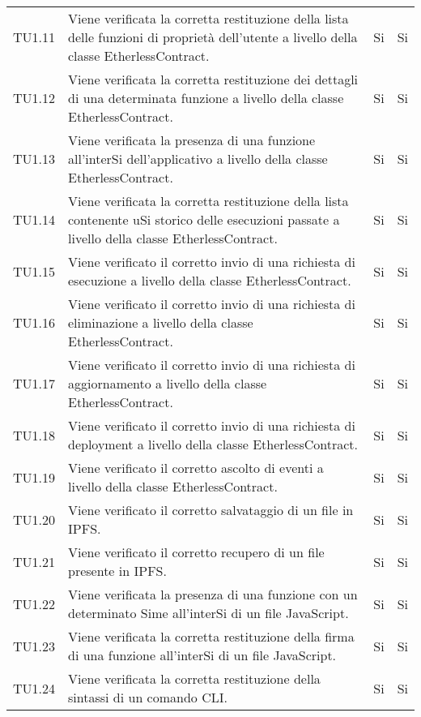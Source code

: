 \begin{longtable}{
		>{\centering}p{}
		>{}p{}
		>{\centering}p{}
		>{\centering}p{} }
		TU1.11 &
		Viene verificata la corretta restituzione della lista delle funzioni di proprietà dell’utente a livello della classe EtherlessContract. &
		Si &
		Si \tabularnewline

		TU1.12 &
		Viene verificata la corretta restituzione dei dettagli di una determinata funzione a livello della classe EtherlessContract. &
		Si &
		Si \tabularnewline

		TU1.13 &
		Viene verificata la presenza di una funzione all’interSi dell’applicativo a livello della classe EtherlessContract. &
		Si &
		Si \tabularnewline

		TU1.14 &
		Viene verificata la corretta restituzione della lista contenente uSi storico delle esecuzioni passate a livello della classe EtherlessContract. &
		Si &
		Si \tabularnewline

		TU1.15 &
		Viene verificato il corretto invio di una richiesta di esecuzione a livello della classe EtherlessContract. &
		Si &
		Si \tabularnewline

		TU1.16 &
		Viene verificato il corretto invio di una richiesta di eliminazione a livello della classe EtherlessContract. &
		Si &
		Si \tabularnewline

		TU1.17 &
		Viene verificato il corretto invio di una richiesta di aggiornamento a livello della classe EtherlessContract. &
		Si &
		Si \tabularnewline

		TU1.18 &
		Viene verificato il corretto invio di una richiesta di deployment\ped{\textit{G}} a livello della classe EtherlessContract. &
		Si &
		Si \tabularnewline

		TU1.19 &
		Viene verificato il corretto ascolto di eventi\ped{\textit{G}} a livello della classe EtherlessContract. &
		Si &
		Si \tabularnewline

		TU1.20 &
		Viene verificato il corretto salvataggio di un file in IPFS\ped{\textit{G}}. &
		Si &
		Si \tabularnewline

		TU1.21 &
		Viene verificato il corretto recupero di un file presente in IPFS\ped{\textit{G}}. &
		Si &
		Si \tabularnewline

		TU1.22 &
		Viene verificata la presenza di una funzione con un determinato Sime all’interSi di un file JavaScript\ped{\textit{G}}. &
		Si &
		Si \tabularnewline

		TU1.23 &
		Viene verificata la corretta restituzione della firma di una funzione all’interSi di un file JavaScript\ped{\textit{G}}. &
		Si &
		Si \tabularnewline

		TU1.24 &
		Viene verificata la corretta restituzione della sintassi di un comando CLI\ped{\textit{G}}. &
		Si &
		Si \tabularnewline


\end{longtable}
